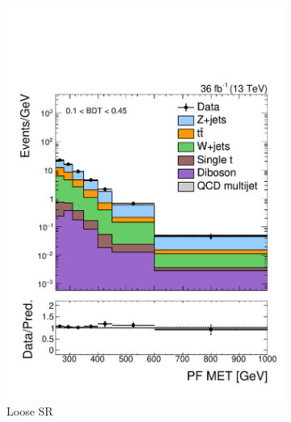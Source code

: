 \begin{figure}[!ht]
    \begin{center}
        \begin{subfigure}[t]{0.49\textwidth}
            \includegraphics[width=\textwidth]{figures/monotop/prefit/signal_loose_pfmet_logy.pdf}
            \caption{Loose SR}
        \end{subfigure}
        \begin{subfigure}[t]{0.49\textwidth}

\end{subfigure}
\end{center}
\end{figure}
